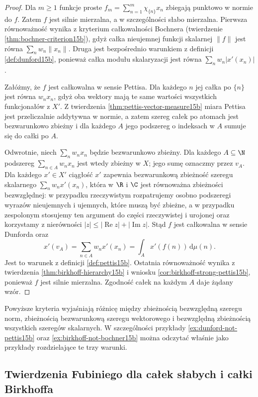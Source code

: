 \begin{proof}
Dla $m\ge1$ funkcje proste
$f_m=\sum_{n=1}^m\chi_{\{n\}}x_n$ zbiegają punktowo w normie
do $f$. Zatem $f$ jest silnie mierzalna, a w szczególności
słabo mierzalna. Pierwsza równoważność wynika z kryterium
całkowalności Bochnera (twierdzenie \ref{thm:bochner-criterion15b}),
gdyż całka nieujemnej funkcji skalarnej $\|f\|$ jest równa
$\sum_n w_n\|x_n\|$. Druga jest bezpośrednio warunkiem
z definicji \ref{def:dunford15b}, ponieważ całka modułu
skalaryzacji jest równa $\sum_n w_n|x'(x_n)|$.

Załóżmy, że $f$ jest całkowalna w sensie Pettisa.
Dla każdego $n$ jej całka po $\{n\}$ jest równa $w_nx_n$,
gdyż oba wektory mają te same wartości wszystkich
funkcjonałów z $X'$. Z twierdzenia
\ref{thm:pettis-vector-measure15b} miara Pettisa jest
przeliczalnie addytywna w normie, a zatem szereg całek po
atomach jest bezwarunkowo zbieżny i dla każdego $A$ jego
podszereg o indeksach w $A$ sumuje się do całki po $A$.

Odwrotnie, niech $\sum_n w_nx_n$ będzie bezwarunkowo zbieżny.
Dla każdego $A\subseteq\N$ podszereg
$\sum_{n\in A}w_nx_n$ jest wtedy zbieżny w $X$; jego sumę
oznaczmy przez $v_A$. Dla każdego $x'\in X'$ ciągłość
$x'$ zapewnia bezwarunkową zbieżność szeregu skalarnego
$\sum_n w_nx'(x_n)$, która w $\R$ i $\C$ jest równoważna
zbieżności bezwzględnej: w przypadku rzeczywistym rozpatrujemy
osobno podszeregi wyrazów nieujemnych i ujemnych, które
muszą być zbieżne, a w przypadku zespolonym stosujemy ten
argument do części rzeczywistej i urojonej oraz korzystamy
z nierówności $|z|\le|\operatorname{Re}z|+|\operatorname{Im}z|$.
Stąd $f$ jest całkowalna w sensie Dunforda oraz
\[
 x'(v_A)=\sum_{n\in A}w_nx'(x_n)
        =\int_A x'(f(n))\,\mathrm d\mu(n).
\]
Jest to warunek z definicji \ref{def:pettis15b}.
Ostatnia równoważność wynika z twierdzenia
\ref{thm:birkhoff-hierarchy15b} i wniosku
\ref{cor:birkhoff-strong-pettis15b}, ponieważ $f$ jest silnie
mierzalna. Zgodność całek na każdym $A$ daje żądany wzór.
\end{proof}

Powyższe kryteria wyjaśniają różnicę między zbieżnością
bezwzględną szeregu norm, zbieżnością bezwarunkową szeregu
wektorowego i bezwzględną zbieżnością wszystkich szeregów
skalarnych. W szczególności przykłady
\ref{ex:dunford-not-pettis15b} oraz
\ref{ex:birkhoff-not-bochner15b} można odczytać właśnie
jako przykłady rozdzielające te trzy warunki.

\subsection{Twierdzenia Fubiniego dla całek słabych i całki Birkhoffa}

